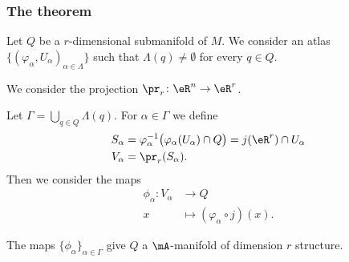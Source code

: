 \subsubsection{The theorem}


\begin{proposition}	\label{PROPooMKLBooTkqrph}
	Let \( Q\) be a \( r\)-dimensional submanifold of \( M\). We consider an atlas \( \{ (\varphi_{\alpha},U_{\alpha})_{\alpha\in \Lambda} \}\) such that \( \Lambda(q)\neq \emptyset\) for every \( q\in Q\).

	We consider the projection \(\pr_r \colon \eR^n\to \eR^r  \).

	Let \( \Gamma=\bigcup_{q\in Q}\Lambda(q)\). For \( \alpha\in \Gamma\) we define
	\begin{subequations}
		\begin{align}
			S_{\alpha} & =\varphi_{\alpha}^{-1}\big( \varphi_{\alpha}(U_{\alpha})\cap Q \big) =j(\eR^r)\cap U_{\alpha} \\
			V_{\alpha} & =\pr_r(S_{\alpha}).
		\end{align}
	\end{subequations}
	Then we consider the maps
	\begin{equation}
		\begin{aligned}
			\phi_{\alpha}\colon V_{\alpha} & \to Q                                 \\
			x                              & \mapsto (\varphi_{\alpha}\circ j)(x).
		\end{aligned}
	\end{equation}


	The maps \( \{ \phi_{\alpha} \}_{\alpha\in\Gamma}\) give \( Q\) a \( \mA\)-manifold of dimension \( r\) structure.

\end{proposition}

